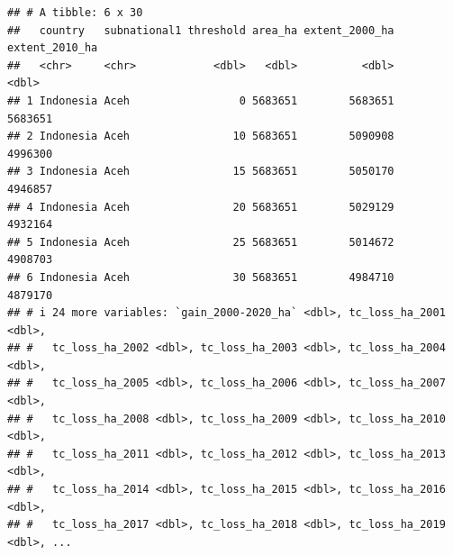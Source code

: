 \documentclass[
]{article}
\begin{document}
\begin{verbatim}
## # A tibble: 6 x 30
##   country   subnational1 threshold area_ha extent_2000_ha extent_2010_ha
##   <chr>     <chr>            <dbl>   <dbl>          <dbl>          <dbl>
## 1 Indonesia Aceh                 0 5683651        5683651        5683651
## 2 Indonesia Aceh                10 5683651        5090908        4996300
## 3 Indonesia Aceh                15 5683651        5050170        4946857
## 4 Indonesia Aceh                20 5683651        5029129        4932164
## 5 Indonesia Aceh                25 5683651        5014672        4908703
## 6 Indonesia Aceh                30 5683651        4984710        4879170
## # i 24 more variables: `gain_2000-2020_ha` <dbl>, tc_loss_ha_2001 <dbl>,
## #   tc_loss_ha_2002 <dbl>, tc_loss_ha_2003 <dbl>, tc_loss_ha_2004 <dbl>,
## #   tc_loss_ha_2005 <dbl>, tc_loss_ha_2006 <dbl>, tc_loss_ha_2007 <dbl>,
## #   tc_loss_ha_2008 <dbl>, tc_loss_ha_2009 <dbl>, tc_loss_ha_2010 <dbl>,
## #   tc_loss_ha_2011 <dbl>, tc_loss_ha_2012 <dbl>, tc_loss_ha_2013 <dbl>,
## #   tc_loss_ha_2014 <dbl>, tc_loss_ha_2015 <dbl>, tc_loss_ha_2016 <dbl>,
## #   tc_loss_ha_2017 <dbl>, tc_loss_ha_2018 <dbl>, tc_loss_ha_2019 <dbl>, ...
\end{verbatim}
\end{document}
